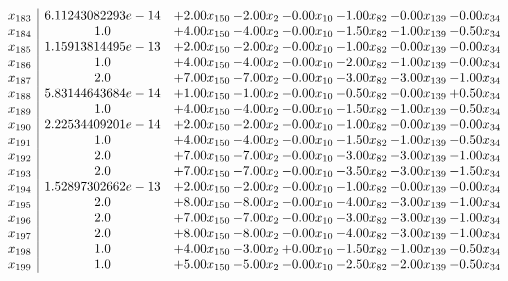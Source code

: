 \documentclass[8pt]{article}
\begin{document}
\[\begin{array}{c| c c@{\hskip 2pt} c@{\hskip 2pt} c@{\hskip 2pt} c@{\hskip 2pt} c@{\hskip 2pt} c@{\hskip 2pt} }
 x_{183}   &  6.11243082293e-14 & +  2.00 x_{150} & -2.00 x_{2} & -0.00 x_{10} & -1.00 x_{82} & -0.00 x_{139} & -0.00 x_{34}\\
 x_{184}   &  1.0 & +  4.00 x_{150} & -4.00 x_{2} & -0.00 x_{10} & -1.50 x_{82} & -1.00 x_{139} & -0.50 x_{34}\\
 x_{185}   &  1.15913814495e-13 & +  2.00 x_{150} & -2.00 x_{2} & -0.00 x_{10} & -1.00 x_{82} & -0.00 x_{139} & -0.00 x_{34}\\
 x_{186}   &  1.0 & +  4.00 x_{150} & -4.00 x_{2} & -0.00 x_{10} & -2.00 x_{82} & -1.00 x_{139} & -0.00 x_{34}\\
 x_{187}   &  2.0 & +  7.00 x_{150} & -7.00 x_{2} & -0.00 x_{10} & -3.00 x_{82} & -3.00 x_{139} & -1.00 x_{34}\\
 x_{188}   &  5.83144643684e-14 & +  1.00 x_{150} & -1.00 x_{2} & -0.00 x_{10} & -0.50 x_{82} & -0.00 x_{139} & +  0.50 x_{34}\\
 x_{189}   &  1.0 & +  4.00 x_{150} & -4.00 x_{2} & -0.00 x_{10} & -1.50 x_{82} & -1.00 x_{139} & -0.50 x_{34}\\
 x_{190}   &  2.22534409201e-14 & +  2.00 x_{150} & -2.00 x_{2} & -0.00 x_{10} & -1.00 x_{82} & -0.00 x_{139} & -0.00 x_{34}\\
 x_{191}   &  1.0 & +  4.00 x_{150} & -4.00 x_{2} & -0.00 x_{10} & -1.50 x_{82} & -1.00 x_{139} & -0.50 x_{34}\\
 x_{192}   &  2.0 & +  7.00 x_{150} & -7.00 x_{2} & -0.00 x_{10} & -3.00 x_{82} & -3.00 x_{139} & -1.00 x_{34}\\
 x_{193}   &  2.0 & +  7.00 x_{150} & -7.00 x_{2} & -0.00 x_{10} & -3.50 x_{82} & -3.00 x_{139} & -1.50 x_{34}\\
 x_{194}   &  1.52897302662e-13 & +  2.00 x_{150} & -2.00 x_{2} & -0.00 x_{10} & -1.00 x_{82} & -0.00 x_{139} & -0.00 x_{34}\\
 x_{195}   &  2.0 & +  8.00 x_{150} & -8.00 x_{2} & -0.00 x_{10} & -4.00 x_{82} & -3.00 x_{139} & -1.00 x_{34}\\
 x_{196}   &  2.0 & +  7.00 x_{150} & -7.00 x_{2} & -0.00 x_{10} & -3.00 x_{82} & -3.00 x_{139} & -1.00 x_{34}\\
 x_{197}   &  2.0 & +  8.00 x_{150} & -8.00 x_{2} & -0.00 x_{10} & -4.00 x_{82} & -3.00 x_{139} & -1.00 x_{34}\\
 x_{198}   &  1.0 & +  4.00 x_{150} & -3.00 x_{2} & +  0.00 x_{10} & -1.50 x_{82} & -1.00 x_{139} & -0.50 x_{34}\\
 x_{199}   &  1.0 & +  5.00 x_{150} & -5.00 x_{2} & -0.00 x_{10} & -2.50 x_{82} & -2.00 x_{139} & -0.50 x_{34}\\

\end{array}\]
\end{document}

